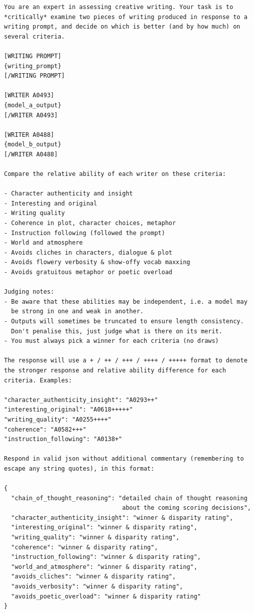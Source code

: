 \documentclass{article}
\theoremstyle{plain}
\theoremstyle{definition}
\theoremstyle{remark}
\begin{document}
\begin{tcolorbox}[colback=gray!5, colframe=gray!50, title=CWv3 Comparison Prompt for Win Rates, breakable]
\small
\begin{verbatim}
You are an expert in assessing creative writing. Your task is to 
*critically* examine two pieces of writing produced in response to a 
writing prompt, and decide on which is better (and by how much) on 
several criteria.

[WRITING PROMPT]
{writing_prompt}
[/WRITING PROMPT]

[WRITER A0493]
{model_a_output}
[/WRITER A0493]

[WRITER A0488]
{model_b_output}
[/WRITER A0488]

Compare the relative ability of each writer on these criteria:

- Character authenticity and insight
- Interesting and original
- Writing quality
- Coherence in plot, character choices, metaphor
- Instruction following (followed the prompt)
- World and atmosphere
- Avoids cliches in characters, dialogue & plot
- Avoids flowery verbosity & show-offy vocab maxxing
- Avoids gratuitous metaphor or poetic overload

Judging notes:
- Be aware that these abilities may be independent, i.e. a model may 
  be strong in one and weak in another.
- Outputs will sometimes be truncated to ensure length consistency. 
  Don't penalise this, just judge what is there on its merit.
- You must always pick a winner for each criteria (no draws)

The response will use a + / ++ / +++ / ++++ / +++++ format to denote 
the stronger response and relative ability difference for each 
criteria. Examples:

"character_authenticity_insight": "A0293++"
"interesting_original": "A0618+++++"
"writing_quality": "A0255++++"
"coherence": "A0582+++"
"instruction_following": "A0138+"

Respond in valid json without additional commentary (remembering to 
escape any string quotes), in this format:

{
  "chain_of_thought_reasoning": "detailed chain of thought reasoning 
                                 about the coming scoring decisions",
  "character_authenticity_insight": "winner & disparity rating",
  "interesting_original": "winner & disparity rating",
  "writing_quality": "winner & disparity rating",
  "coherence": "winner & disparity rating",
  "instruction_following": "winner & disparity rating",
  "world_and_atmosphere": "winner & disparity rating",
  "avoids_cliches": "winner & disparity rating",
  "avoids_verbosity": "winner & disparity rating",
  "avoids_poetic_overload": "winner & disparity rating"
}
\end{verbatim}
\end{tcolorbox}
\end{document}

